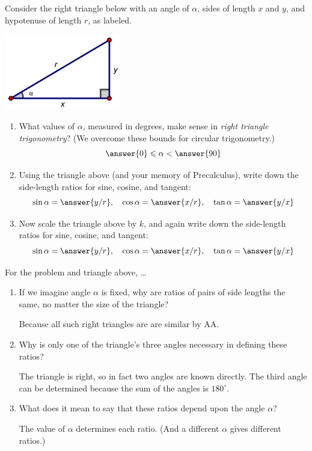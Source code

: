 \documentclass[nooutcomes]{ximera}
\begin{document}
\begin{problem}
Consider the right triangle below with an angle of $\alpha$, sides of length $x$ and $y$, and hypotenuse of length $r$, as labeled.  
\begin{image}
\includegraphics[width=2in]{rightTriangle.png}
\end{image}
\begin{enumerate}
\item What values of $\alpha$, measured in degrees, make sense in \emph{right triangle trigonometry}?  (We overcome these bounds for circular trigonometry.)
\[
\answer{0} \le \alpha < \answer{90}
\]  
\item Using the triangle above (and your memory of Precalculus), write down the side-length ratios for sine, cosine, and tangent:  
\[
\sin\alpha = \answer{y/r}, \quad
 \cos\alpha = \answer{x/r}, \quad
  \tan\alpha = \answer{y/x}
\]
\item Now scale the triangle above by $k$, and again write down the side-length ratios for sine, cosine, and tangent:  
\[
\sin\alpha = \answer{y/r}, \quad
 \cos\alpha = \answer{x/r}, \quad
  \tan\alpha = \answer{y/x}
\]
\end{enumerate}
\end{problem}

\begin{problem}
For the problem and triangle above, \dots
\begin{enumerate}
\item If we imagine angle $\alpha$ is fixed, why are ratios of pairs of side lengths the same, no matter the size of the triangle?
  \begin{hint}Because all such right triangles are are similar by AA.  \end{hint}
\item Why is only one of the triangle's three angles necessary in defining these ratios?  
  \begin{hint}The triangle is right, so in fact two angles are known directly.  The third angle can be determined because the sum of the angles is $180^\circ$.\end{hint}  
\item What does it mean to say that these ratios depend upon the angle $\alpha$?  
  \begin{hint}The value of $\alpha$ determines each ratio.  (And a different $\alpha$ gives different ratios.)\end{hint}
\end{enumerate}
\begin{freeResponse}
\end{freeResponse}
\end{problem}
\end{document}
